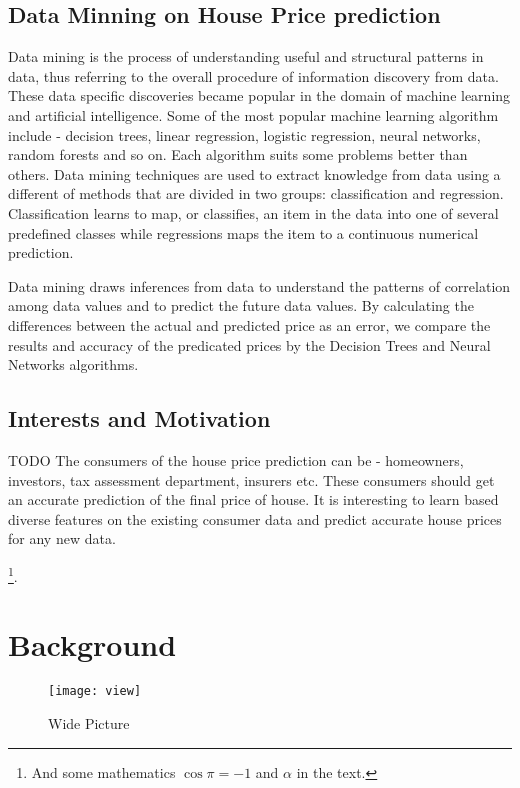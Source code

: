 \documentclass[fleqn,10pt]{SelfArx} %
\begin{document}
\subsection{Data Minning on House Price prediction}
Data mining is the process of understanding useful and structural patterns in data, thus referring to the overall procedure of information discovery from data. These data specific discoveries became popular in the domain of machine learning and artificial intelligence. Some of the most popular machine learning algorithm include - decision trees, linear regression, logistic regression, neural networks, random forests and so on. Each algorithm suits some problems better than others. Data mining techniques are used to extract knowledge from data using a different of methods that are divided in two groups: classification and regression. Classification learns to map, or classifies, an item in the data into one of several predefined classes while regressions maps the item to a continuous numerical prediction.

Data mining draws inferences from data to understand the patterns of correlation among data values and to predict the future data values. By calculating the differences between the actual and predicted price as an error, we compare the results and accuracy of the predicated prices by the Decision Trees and Neural Networks algorithms. 

\subsection{Interests and Motivation}
TODO
The consumers of the house price prediction can be - homeowners, investors, tax assessment department, insurers etc. These consumers should get an accurate prediction of the final price of house. It is interesting to learn based diverse features on the existing consumer data and predict accurate house prices for any new data.  

\footnote{And some mathematics $\cos\pi=-1$ and $\alpha$ in the text.}.


\section{Background}

\begin{figure*}[ht]\centering %
\texttt{[image: view]}
\caption{Wide Picture}
\label{fig:view}
\end{figure*}
\end{document}
